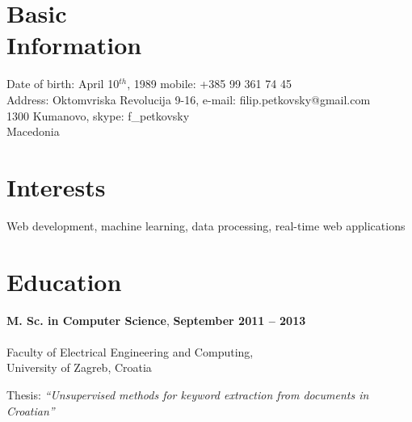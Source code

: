 \documentclass[margin,line]{resume}
\begin{document}
\begin{resume}

    \section{\mysidestyle Basic\\Information}

    Date of birth: April 10$^{th}$, 1989                \hfill mobile: +385 99 361 74 45          
    \vspace{0mm}\\
    \vspace{0mm}%
    Address: Oktomvriska Revolucija 9-16,               \hfill e-mail: filip.petkovsky@gmail.com 
    \\
    \vspace{0mm}%
    1300 Kumanovo,                                      \hfill skype: f\_petkovsky  
    \vspace{0mm} \\
    \vspace{0mm}%
    Macedonia 
    \vspace{0mm} \\
    \vspace{0mm}%
              
    \vspace{0mm} 
    
    \section{\mysidestyle Interests}

    Web development, machine learning, data processing, real-time web applications


    \section{\mysidestyle Education}

    \textbf{M. Sc. in Computer Science}, \hfill \textbf{ September 2011 -- 2013 }\vspace{-3mm}\\\vspace{-1mm}%
    \\Faculty of Electrical Engineering and Computing,\\
    University of Zagreb, Croatia \vspace{1mm}%
    \textsl{} 
    \begin{list2}
        \item Thesis: \textsl{``Unsupervised methods for keyword extraction from documents in Croatian''} 
    \end{list2}


\end{resume}
\end{document}
